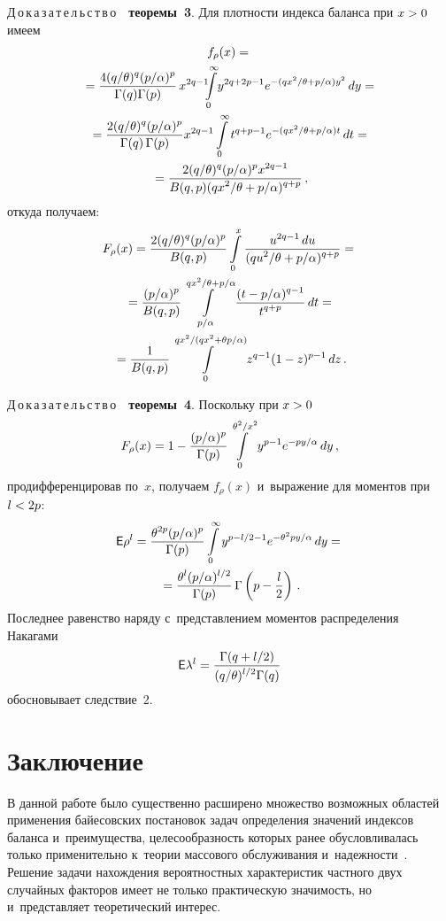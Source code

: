 \begin{multicols}{2}
\noindent
Д\,о\,к\,а\,з\,а\,т\,е\,л\,ь\,с\,т\,в\,о\ \ {\bf теоремы~3}. 
Для плотности индекса баланса при $x\hm>0$ имеем
\begin{multline*}
f_\rho(x)={}\\
\hspace*{-2pt}\!{}=\displaystyle\frac{\displaystyle 4(q/\theta)^q(p/\alpha)^p\mathstrut}{\displaystyle \Gamma(q)\Gamma(p)\mathstrut}\,x^{2q-1}
\!\!\!\int\limits_0^\infty \!y^{2q+2p-1}e^{-(qx^2/\theta+p/\alpha)y^2}\,dy={}\hspace*{-3.94243pt}\\
{}=\displaystyle\frac{\displaystyle 2(q/\theta)^q(p/\alpha)^p\mathstrut}{\displaystyle \Gamma(q)\,\Gamma(p)\mathstrut}x^{2q-1}
\int\limits_0^\infty t^{q+p-1}e^{-(qx^2/\theta+p/\alpha)t}\,dt={}\\
{}=
\displaystyle\frac{\displaystyle 2(q/\theta)^q(p/\alpha)^p x^{2q-1}\mathstrut}{\displaystyle B(q,p) (q x^2/\theta+p/\alpha)^{q+p}\mathstrut}\,,
\end{multline*}
откуда получаем:
\begin{multline*}
F_\rho(x)=\displaystyle\frac{\displaystyle 2(q/\theta)^q(p/\alpha)^p\mathstrut}{\displaystyle B(q,p)\mathstrut}
\int\limits_0^x \displaystyle\frac{\displaystyle u^{2q-1}\,du\mathstrut}{\displaystyle (q u^2/\theta+p/\alpha)^{q+p}\mathstrut}={}\\
{}=\displaystyle\frac{\displaystyle (p/\alpha)^p\mathstrut}{\displaystyle B(q,p)\mathstrut}
\int\limits_{p/\alpha}^{qx^2/\theta+p/\alpha}\displaystyle\frac{\displaystyle (t-p/\alpha)^{q-1}\mathstrut}{\displaystyle t^{q+p}\mathstrut}\,dt={}\\
{}=
\displaystyle\frac{\displaystyle 1\mathstrut}{\displaystyle B(q,p)\mathstrut}\int\limits_0^{qx^2/(qx^2+\theta p/\alpha)}z^{q-1}(1-z)^{p-1}\,dz\,.
\end{multline*}

\noindent
Д\,о\,к\,а\,з\,а\,т\,е\,л\,ь\,с\,т\,в\,о\ \ {\bf теоремы~4}. Поскольку при $x\hm>0$
$$
F_\rho(x)=1-\displaystyle\frac{\displaystyle (p/\alpha)^p\mathstrut}{\displaystyle \Gamma(p)\mathstrut}\int\limits_0^{\theta^2/x^2} y^{p-1}
e^{-py/\alpha}\,dy\,,
$$
продифференцировав по~$x$, получаем $f_\rho(x)$ и~выражение для моментов при $l\hm<2p$:
\begin{multline*}
{\sf E}\rho^l=\displaystyle\frac{\displaystyle \theta^{2p}(p/\alpha)^p\mathstrut}{\displaystyle \Gamma(p)\mathstrut}
\int\limits_0^\infty y^{p-l/2-1}e^{-\theta^2py/\alpha}\,dy={}\\
{}=
\displaystyle\frac{\displaystyle \theta^l(p/\alpha)^{l/2}\mathstrut}{\displaystyle \Gamma(p)\mathstrut}\,\Gamma\left(p-\displaystyle\frac{\displaystyle l\mathstrut}{\displaystyle 2\mathstrut}\right)\,.
\end{multline*}
Последнее равенство наряду с~представлением моментов распределения Накагами
$${\sf E}\lambda^l=\displaystyle\frac{\displaystyle \Gamma(q+l/2)\mathstrut}{\displaystyle (q/\theta)^{l/2}\Gamma(q)\mathstrut}
$$
обосновывает следствие~2.

\section{Заключение}

В данной работе было существенно расширено множество возможных областей
 применения байесовских постановок задач определения значений индексов 
 баланса и~преимущества, целесообразность которых ранее обусловливалась 
 только применительно к~теории массового обслуживания 
 и~на\-деж\-ности~\cite{Shorgin05,BKSSh2007,KuSh2015}. Решение задачи нахождения 
 вероятностных характеристик частного двух случайных факторов имеет не 
 только практическую значимость, но и~представляет тео\-ре\-ти\-че\-ский интерес.




\end{multicols}
